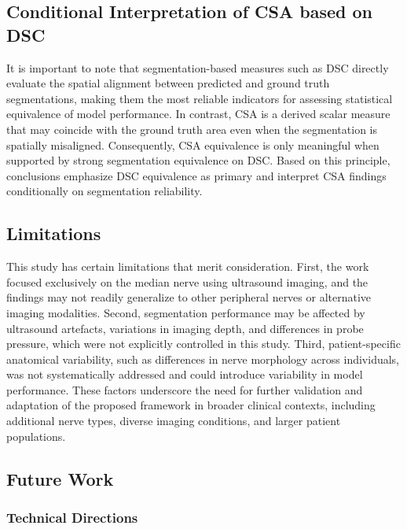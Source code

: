 \subsection{Conditional Interpretation of CSA based on DSC}
It is important to note that segmentation-based measures such as DSC directly evaluate the spatial alignment between predicted and ground truth segmentations, making them the most reliable indicators for assessing statistical equivalence of model performance. In contrast, CSA is a derived scalar measure that may coincide with the ground truth area even when the segmentation is spatially misaligned. Consequently, CSA equivalence is only meaningful when supported by strong segmentation equivalence on DSC. Based on this principle, conclusions emphasize DSC equivalence as primary and interpret CSA findings conditionally on segmentation reliability.


\subsection{Limitations}
\noindent
This study has certain limitations that merit consideration. First, the work focused exclusively on the median nerve using ultrasound imaging, and the findings may not readily generalize to other peripheral nerves or alternative imaging modalities. Second, segmentation performance may be affected by ultrasound artefacts, variations in imaging depth, and differences in probe pressure, which were not explicitly controlled in this study. Third, patient-specific anatomical variability, such as differences in nerve morphology across individuals, was not systematically addressed and could introduce variability in model performance. These factors underscore the need for further validation and adaptation of the proposed framework in broader clinical contexts, including additional nerve types, diverse imaging conditions, and larger patient populations.

\subsection{Future Work}
\subsubsection{Technical Directions}


